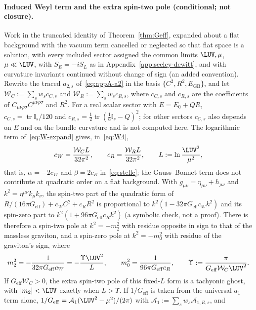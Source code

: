 \paragraph{Induced Weyl term and the extra spin-two pole (conditional; not closure).}
Work in the truncated identity of Theorem~\ref{thm:Geff}, expanded about
a flat background with the vacuum term cancelled or neglected so that
flat space is a solution, with every included sector assigned the common
limits \(\LUV,\mu\), \(\mu\ll\LUV\), with \(S_E=-iS_L\) as in
Appendix~\ref{app:seeley-dewitt}, and with curvature invariants
continued without change of sign (an added convention). Rewrite the
traced \(a_{2,s}\) of~\eqref{eq:appA-a2} in the basis
\(\{C^2,R^2,E_{\mathrm{GB}}\}\), and let
\(\mathcal W_C:=\sum_sw_sc_{C,s}\) and \(\mathcal W_R:=\sum_sw_sc_{R,s}\),
where \(c_{C,s}\) and \(c_{R,s}\) are the coefficients of
\(C_{\mu\nu\rho\sigma}C^{\mu\nu\rho\sigma}\) and \(R^2\). For a real
scalar sector with \(E=E_0+QR\), \(c_{C,s}=\operatorname{tr}\mathbb I_s/120\)
and \(c_{R,s}=\tfrac12\operatorname{tr}(\tfrac16\mathbb I_s-Q)^2\); for
other sectors \(c_{C,s}\) also depends on \(E\) and on the bundle
curvature and is not computed here. The logarithmic term
of~\eqref{eq:W-expand} gives, in~\eqref{eq:W4},
\[
  c_W=\frac{\mathcal W_C L}{32\pi^2},\qquad
  c_R=\frac{\mathcal W_R L}{32\pi^2},\qquad
  L:=\ln\frac{\LUV^2}{\mu^2},
\]
that is, \(\alpha=-2c_W\) and \(\beta=2c_R\) in~\eqref{eq:stelle}; the
Gauss--Bonnet term does not contribute at quadratic order on a flat
background. With \(g_{\mu\nu}=\eta_{\mu\nu}+h_{\mu\nu}\) and
\(k^2=\eta^{\mu\nu}k_\mu k_\nu\), the spin-two part of the quadratic form
of \(R/(16\pi G_{\mathrm{eff}})+c_WC^2+c_RR^2\) is proportional to
\(k^2(1-32\pi G_{\mathrm{eff}}c_Wk^2)\) and its spin-zero part to
\(k^2(1+96\pi G_{\mathrm{eff}}c_Rk^2)\) (a symbolic check, not a proof).
There is therefore a spin-two pole at \(k^2=-m_2^2\) with residue
opposite in sign to that of the massless graviton, and a spin-zero pole
at \(k^2=-m_0^2\) with residue of the graviton's sign, where
\[
  m_2^2=-\frac{1}{32\pi G_{\mathrm{eff}}c_W}
       =-\frac{\Upsilon\LUV^2}{L},
  \qquad
  m_0^2=\frac{1}{96\pi G_{\mathrm{eff}}c_R},
  \qquad
  \Upsilon:=\frac{\pi}{G_{\mathrm{eff}}\mathcal W_C\LUV^2}.
\]
If \(G_{\mathrm{eff}}\mathcal W_C>0\), the extra spin-two pole of this
fixed-\(L\) form is a tachyonic ghost, with \(|m_2|<\LUV\) exactly when
\(L>\Upsilon\). If \(1/G_{\mathrm{eff}}\) is taken from the
universal \(a_1\) term alone, \(1/G_{\mathrm{eff}}
=\mathcal A_1(\LUV^2-\mu^2)/(2\pi)\) with
\(\mathcal A_1:=\sum_sw_s\mathcal A_{1,R,s}\), and
